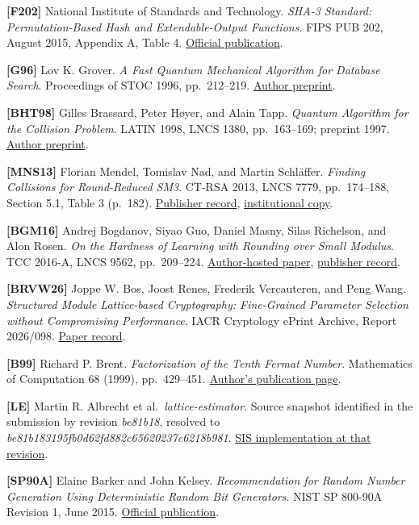 \documentclass[
  american,
  10pt,
  a4paper,
]{article}
\begin{document}
\textbf{{[}F202{]}} National Institute of Standards and Technology.
\emph{SHA-3 Standard: Permutation-Based Hash and Extendable-Output
Functions}. FIPS PUB 202, August 2015, Appendix A, Table 4.
\href{https://nvlpubs.nist.gov/nistpubs/FIPS/NIST.FIPS.202.pdf}{Official
publication}.

\textbf{{[}G96{]}} Lov K. Grover. \emph{A Fast Quantum Mechanical
Algorithm for Database Search}. Proceedings of STOC 1996, pp.~212--219.
\href{https://arxiv.org/abs/quant-ph/9605043}{Author preprint}.

\textbf{{[}BHT98{]}} Gilles Brassard, Peter Høyer, and Alain Tapp.
\emph{Quantum Algorithm for the Collision Problem}. LATIN 1998, LNCS
1380, pp.~163--169; preprint 1997.
\href{https://arxiv.org/abs/quant-ph/9705002}{Author preprint}.

\textbf{{[}MNS13{]}} Florian Mendel, Tomislav Nad, and Martin Schläffer.
\emph{Finding Collisions for Round-Reduced SM3}. CT-RSA 2013, LNCS 7779,
pp.~174--188, Section 5.1, Table 3 (p.~182).
\href{https://doi.org/10.1007/978-3-642-36095-4_12}{Publisher record},
\href{https://pure.tugraz.at/ws/portalfiles/portal/80044228/sm3.pdf}{institutional
copy}.

\textbf{{[}BGM16{]}} Andrej Bogdanov, Siyao Guo, Daniel Masny, Silas
Richelson, and Alon Rosen. \emph{On the Hardness of Learning with
Rounding over Small Modulus}. TCC 2016-A, LNCS 9562, pp.~209--224.
\href{https://people.csail.mit.edu/sirichel/lwr.pdf}{Author-hosted
paper}, \href{https://doi.org/10.1007/978-3-662-49096-9_9}{publisher
record}.

\textbf{{[}BRVW26{]}} Joppe W. Bos, Joost Renes, Frederik Vercauteren,
and Peng Wang. \emph{Structured Module Lattice-based Cryptography:
Fine-Grained Parameter Selection without Compromising Performance}. IACR
Cryptology ePrint Archive, Report 2026/098.
\href{https://eprint.iacr.org/2026/098}{Paper record}.

\textbf{{[}B99{]}} Richard P. Brent. \emph{Factorization of the Tenth
Fermat Number}. Mathematics of Computation 68 (1999), pp.~429--451.
\href{https://maths-people.anu.edu.au/~brent/pub/pub161.html}{Author's
publication page}.

\textbf{{[}LE{]}} Martin R. Albrecht et al.~\emph{lattice-estimator}.
Source snapshot identified in the submission by revision \emph{be81b18},
resolved to \emph{be81b183195fb0d62fd882c65620237c6218b981}.
\href{https://github.com/malb/lattice-estimator/blob/be81b183195fb0d62fd882c65620237c6218b981/estimator/sis_lattice.py}{SIS
implementation at that revision}.

\textbf{{[}SP90A{]}} Elaine Barker and John Kelsey. \emph{Recommendation
for Random Number Generation Using Deterministic Random Bit Generators}.
NIST SP 800-90A Revision 1, June 2015.
\href{https://nvlpubs.nist.gov/nistpubs/specialpublications/nist.sp.800-90ar1.pdf}{Official
publication}.
\end{document}
